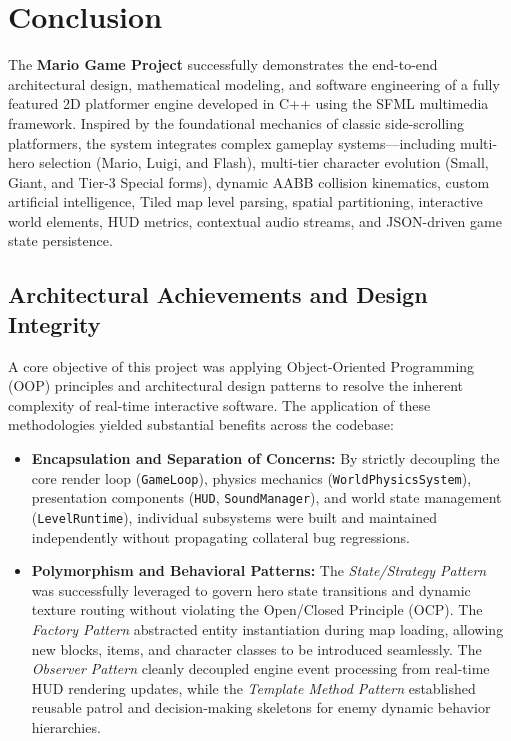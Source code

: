 \section{Conclusion}

The \textbf{Mario Game Project} successfully demonstrates the end-to-end architectural design, mathematical modeling, and software engineering of a fully featured 2D platformer engine developed in C++ using the SFML multimedia framework. Inspired by the foundational mechanics of classic side-scrolling platformers, the system integrates complex gameplay systems—including multi-hero selection (Mario, Luigi, and Flash), multi-tier character evolution (Small, Giant, and Tier-3 Special forms), dynamic AABB collision kinematics, custom artificial intelligence, Tiled map level parsing, spatial partitioning, interactive world elements, HUD metrics, contextual audio streams, and JSON-driven game state persistence.

\subsection{Architectural Achievements and Design Integrity}
A core objective of this project was applying Object-Oriented Programming (OOP) principles and architectural design patterns to resolve the inherent complexity of real-time interactive software. The application of these methodologies yielded substantial benefits across the codebase:
\begin{itemize}
    \item \textbf{Encapsulation and Separation of Concerns:} By strictly decoupling the core render loop (\texttt{GameLoop}), physics mechanics (\texttt{WorldPhysicsSystem}), presentation components (\texttt{HUD}, \texttt{SoundManager}), and world state management (\texttt{LevelRuntime}), individual subsystems were built and maintained independently without propagating collateral bug regressions.
    \item \textbf{Polymorphism and Behavioral Patterns:} The \textit{State/Strategy Pattern} was successfully leveraged to govern hero state transitions and dynamic texture routing without violating the Open/Closed Principle (OCP). The \textit{Factory Pattern} abstracted entity instantiation during map loading, allowing new blocks, items, and character classes to be introduced seamlessly. The \textit{Observer Pattern} cleanly decoupled engine event processing from real-time HUD rendering updates, while the \textit{Template Method Pattern} established reusable patrol and decision-making skeletons for enemy dynamic behavior hierarchies.
\end{itemize}

